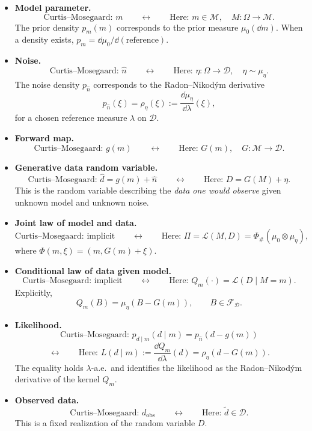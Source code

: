 \documentclass[11pt]{article}
\theoremstyle{remark}
\newcommand{\modelspace}{\mathcal{M}}
\newcommand{\dataspace}{\mathcal{D}}
\begin{document}
\begin{itemize}

\item \textbf{Model parameter.}
\[
\text{Curtis--Mosegaard: } m
\qquad\longleftrightarrow\qquad
\text{Here: } m\in\modelspace,
\quad M:\Omega\to\modelspace.
\]
The prior density \(p_m(m)\) corresponds to the prior measure
\(\mu_0(\dd m)\).
When a density exists, \(p_m=\dd\mu_0/\dd(\text{reference})\).

\item \textbf{Noise.}
\[
\text{Curtis--Mosegaard: } \hat n
\qquad\longleftrightarrow\qquad
\text{Here: } \eta:\Omega\to\dataspace,
\quad \eta\sim\mu_\eta.
\]
The noise density \(p_{\hat n}\) corresponds to the Radon--Nikod\'ym derivative
\[
p_{\hat n}(\xi) = \rho_\eta(\xi) := \frac{\dd\mu_\eta}{\dd\lambda}(\xi),
\]
for a chosen reference measure \(\lambda\) on \(\dataspace\).

\item \textbf{Forward map.}
\[
\text{Curtis--Mosegaard: } g(m)
\qquad\longleftrightarrow\qquad
\text{Here: } G(m),
\quad G:\modelspace\to\dataspace.
\]

\item \textbf{Generative data random variable.}
\[
\text{Curtis--Mosegaard: } \hat d = g(m)+\hat n
\qquad\longleftrightarrow\qquad
\text{Here: } D = G(M)+\eta.
\]
This is the random variable describing the \emph{data one would observe}
given unknown model and unknown noise.

\item \textbf{Joint law of model and data.}
\[
\text{Curtis--Mosegaard: implicit}
\qquad\longleftrightarrow\qquad
\text{Here: } 
\Pi = \mathcal{L}(M,D)
= \Phi_\#(\mu_0\otimes\mu_\eta),
\]
where \(\Phi(m,\xi)=(m,G(m)+\xi)\).

\item \textbf{Conditional law of data given model.}
\[
\text{Curtis--Mosegaard: implicit}
\qquad\longleftrightarrow\qquad
\text{Here: } Q_m(\cdot)=\mathcal{L}(D\mid M=m).
\]
Explicitly,
\[
Q_m(B)=\mu_\eta(B-G(m)),
\qquad B\in\mathcal{F}_{\dataspace}.
\]

\item \textbf{Likelihood.}
\[
\text{Curtis--Mosegaard: } p_{d\mid m}(d \mid m)
= p_{\hat n}(d-g(m))
\]
\[
\longleftrightarrow
\qquad
\text{Here: }
L(d\mid m)
:=\frac{\dd Q_m}{\dd\lambda}(d)
= \rho_\eta(d-G(m)).
\]
The equality holds \(\lambda\)-a.e.\ and identifies the likelihood as the
Radon--Nikod\'ym derivative of the kernel \(Q_m\).

\item \textbf{Observed data.}
\[
\text{Curtis--Mosegaard: } d_{\mathrm{obs}}
\qquad\longleftrightarrow\qquad
\text{Here: } \tilde d\in\dataspace.
\]
This is a fixed realization of the random variable \(D\).


\end{itemize}
\end{document}
